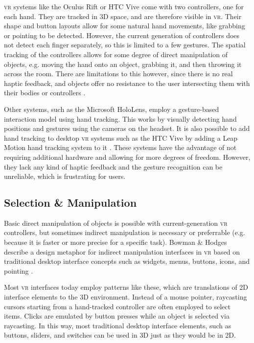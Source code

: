\documentclass[nobib]{tufte-book} %
\begin{document}
\textsc{vr} systems like the Oculus Rift or HTC Vive come with two controllers, one for each hand. They are tracked in 3D space, and are therefore visible in \textsc{vr}. Their shape and button layouts allow for some natural hand movements, like grabbing or pointing to be detected. However, the current generation of controllers does not detect each finger separately, so this is limited to a few gestures. The spatial tracking of the controllers allows for some degree of direct manipulation of objects, e.g. moving the hand onto an object, grabbing it, and then throwing it across the room. There are limitations to this however, since there is no real haptic feedback, and objects offer no resistance to the user intersecting them with their bodies or controllers \cite{sanchez2005presence}.

Other systems, such as the Microsoft HoloLens, employ a gesture-based interaction model using hand tracking. This works by visually detecting hand positions and gestures using the cameras on the headset. It is also possible to add hand tracking to desktop \textsc{vr} systems such as the HTC Vive by adding a Leap Motion hand tracking system to it \cite{wozniak2016possible}. These systems have the advantage of not requiring additional hardware and allowing for more degrees of freedom. However, they lack any kind of haptic feedback and the gesture recognition can be unreliable, which is frustrating for users.

\subsection{Selection \& Manipulation}
Basic direct manipulation of objects is possible with current-generation \textsc{vr} controllers, but sometimes indirect manipulation is necessary or preferrable (e.g. because it is faster or more precise for a specific task). Bowman \& Hodges describe a design metaphor for indirect manipulation interfaces in \textsc{vr}  based on traditional desktop interface concepts such as widgets, menus, buttons, icons, and pointing \cite{bowman1994wimp}.

Most \textsc{vr} interfaces today employ patterns like these, which are translations of 2D interface elements to the 3D environment. Instead of a mouse pointer, raycasting cursors starting from a hand-tracked controller are often employed to select items. Clicks are emulated by button presses while an object is selected via raycasting. In this way, most traditional desktop interface elements, such as buttons, sliders, and switches can be used in 3D just as they would be in 2D.
\end{document}
